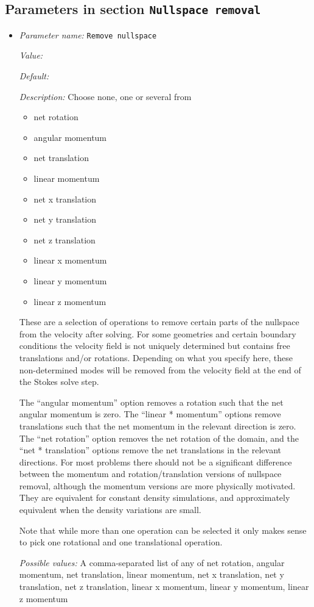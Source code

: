 \subsection{Parameters in section \tt Nullspace removal}
\label{parameters:Nullspace_20removal}

\begin{itemize}
\item {\it Parameter name:} {\tt Remove nullspace}
\label{parameters:Nullspace removal/Remove nullspace}
\label{parameters:Nullspace_20removal/Remove_20nullspace}


{\it Value:} 


{\it Default:} 


{\it Description:} Choose none, one or several from 

\begin{itemize} \item net rotation \item angular momentum \item net translation \item linear momentum \item net x translation \item net y translation \item net z translation \item linear x momentum \item linear y momentum \item linear z momentum \end{itemize}

These are a selection of operations to remove certain parts of the nullspace from the velocity after solving. For some geometries and certain boundary conditions the velocity field is not uniquely determined but contains free translations and/or rotations. Depending on what you specify here, these non-determined modes will be removed from the velocity field at the end of the Stokes solve step.


The ``angular momentum'' option removes a rotation such that the net angular momentum is zero. The ``linear * momentum'' options remove translations such that the net momentum in the relevant direction is zero.  The ``net rotation'' option removes the net rotation of the domain, and the ``net * translation'' options remove the net translations in the relevant directions.  For most problems there should not be a significant difference between the momentum and rotation/translation versions of nullspace removal, although the momentum versions are more physically motivated. They are equivalent for constant density simulations, and approximately equivalent when the density variations are small.

Note that while more than one operation can be selected it only makes sense to pick one rotational and one translational operation.


{\it Possible values:} A comma-separated list of any of net rotation, angular momentum, net translation, linear momentum, net x translation, net y translation, net z translation, linear x momentum, linear y momentum, linear z momentum
\end{itemize}

